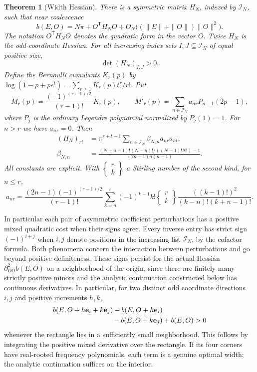\documentclass[11pt]{article}
\newtheorem{theorem}{Theorem}[section]
\newcommand{\ind}{\mathcal I_N}
\begin{document}
\begin{theorem}[Width Hessian]\label{thm:main}
There is a symmetric matrix $H_N$, indexed by $\ind$, such that
near coalescence
\[
 b(E,O)=N\pi+O^{\mathsf T}H_NO+
 O_N\bigl((\|E\|+\|O\|)\|O\|^2\bigr).
\]
The notation $O^{\mathsf T}H_NO$ denotes the quadratic form in the
vector $O$. Twice $H_N$ is the odd-coordinate Hessian. For all
increasing index sets $I,J\subseteq\ind$ of equal positive size,
\[
                     \det (H_N)_{I,J}>0 .
\]
Define the Bernoulli cumulants $K_r(p)$ by
$\log(1-p+pe^t)=\sum_{r\ge1}K_r(p)t^r/r!$. Put
\[
 M_r(p)=\frac{(-1)^{(r-1)/2}}{(r-1)!}\, K_r(p),
 \qquad M'_r(p)=\sum_{n\in\ind}a_{nr}P_{n-1}(2p-1),
\]
where $P_j$ is the ordinary Legendre polynomial normalized by $P_j(1)=1$.
For $n>r$ we have $a_{nr}=0$. Then
\begin{align}
 (H_N)_{rt}&=\pi^{r+t-1}\sum_{n\in\ind}\beta_{N,n}a_{nr}a_{nt},\label{eq:factor}\\
 \beta_{N,n}&=
 \frac{(N+n-1)!(N-n)!/((N-1)!N!)-1}{(2n-1)n(n-1)}.\label{eq:beta}
\end{align}
All constants are explicit. With $\left\{\begin{smallmatrix}r\\ k\end{smallmatrix}\right\}$
a Stirling number of the second kind, for $n\le r$,
\[
 a_{nr}=\frac{(2n-1)(-1)^{(r-1)/2}}{(r-1)!}
 \sum_{k=n}^r (-1)^{k-1}k!\left\{\begin{matrix}r\\ k\end{matrix}\right\}
 \frac{((k-1)!)^2}{(k-n)!(k+n-1)!}.
\]
\end{theorem}

In particular each pair of asymmetric coefficient perturbations has a
positive mixed quadratic cost when their signs agree.
Every inverse entry has strict sign $(-1)^{i+j}$ when $i,j$ denote
positions in the increasing list $\ind$, by the cofactor formula.
Both phenomena concern the interaction between perturbations and go
beyond positive definiteness. These signs persist for the actual Hessian
$\partial^2_{OO}b(E,O)$ on a neighborhood of the origin, since there
are finitely many strictly positive minors and the analytic continuation
constructed below has continuous derivatives. In particular, for two
distinct odd coordinate directions $i,j$ and positive increments $h,k$,
\[
 \begin{split}
 &b(E,O+h\mathbf e_i+k\mathbf e_j)-b(E,O+h\mathbf e_i)\\
 &\hspace{30mm}{}-b(E,O+k\mathbf e_j)+b(E,O)>0
 \end{split}
\]
whenever the rectangle lies in a sufficiently small neighborhood. This
follows by integrating the positive mixed derivative over the rectangle.
If its four corners have real-rooted frequency polynomials, each term
is a genuine optimal width; the analytic continuation suffices on the
interior.
\end{document}
